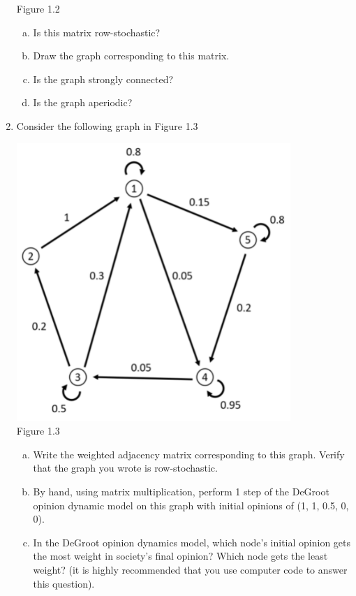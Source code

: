\documentclass[11pt]{article}
\begin{document}
\begin{enumerate}
\begin{center}
Figure 1.2
\end{center}
	\begin{enumerate}[(a)]
		\item Is this matrix row-stochastic?
		\item Draw the graph corresponding to this matrix.
		\item Is the graph strongly connected?
		\item Is the graph aperiodic?
	\end{enumerate}
\item Consider the following graph in Figure 1.3
\begin{center}
\includegraphics[scale=0.6]{Question3_Figure1.3}\\
Figure 1.3
\end{center}
	\begin{enumerate}[(a)]
		\item Write the weighted adjacency matrix corresponding to this graph. Verify that the graph you wrote is row-stochastic.
		\item By hand, using matrix multiplication, perform 1 step of the DeGroot opinion dynamic model on this graph with initial opinions of (1, 1, 0.5, 0, 0).
		\item In the DeGroot opinion dynamics model, which node's initial opinion gets the most weight in society's final opinion? Which node gets the least weight? (it is highly recommended that you use computer code to answer this question).

\end{enumerate}
\end{enumerate}
\end{document}

